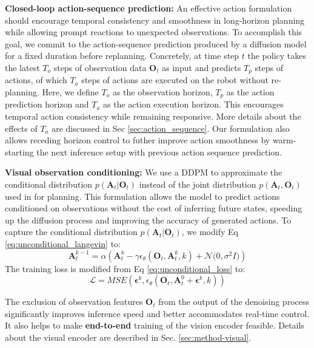 \documentclass[Afour,sageh,times]{sagej}
\begin{document}
\textbf{Closed-loop action-sequence prediction:}
An effective action formulation should encourage temporal consistency and smoothness in long-horizon planning while allowing prompt reactions to unexpected observations.
To accomplish this goal, we commit to the action-sequence prediction produced by a diffusion model for a fixed duration before replanning.
Concretely, at time step $t$ the policy takes the latest $T_o$ steps of observation data $\mathbf{O}_t$ as input and predicts $T_p$ steps of actions, of which $T_a$ steps of actions are executed on the robot without re-planning. Here, we define $T_o$ as the observation horizon, $T_p$ as the action prediction horizon and $T_a$ as the action execution horizon.
This encourages temporal action consistency while remaining responsive. More details about the effects of $T_a$ are discussed in Sec \ref{sec:action_sequence}.
Our formulation also allows receding horizon control \cite{mayne1988receding} to futher improve action smoothness by warm-starting the next inference setup with previous action sequence prediction.




\textbf{Visual observation conditioning:}
We use a DDPM to approximate the conditional distribution $p(\mathbf{A}_t | \mathbf{O}_t)$ instead of the joint distribution $p(\mathbf{A}_t,\mathbf{O}_t)$ used in \citet{janner2022diffuser} for planning. This formulation allows the model to predict actions conditioned on observations without the cost of inferring future states, speeding up the diffusion process and improving the accuracy of generated actions.
To capture the conditional distribution $p(\mathbf{A}_t |\mathbf{O}_t)$, we modify Eq \ref{eq:unconditional_langevin} to:
\begin{equation}
    \label{eq:diffusion_policy_langevin}
    \mathbf{A}^{k-1}_t = \alpha(\mathbf{A}^k_t - \gamma\epsilon_\theta(\mathbf{O}_t,\mathbf{A}^k_t,k) + \mathcal{N} \bigl(0, \sigma^2 I \bigl))
\end{equation}
The training loss is modified from Eq \ref{eq:unconditional_loss} to:
\begin{equation}
    \label{eq:diffusion_policy_loss}
    \mathcal{L}=MSE(\mathbf{\epsilon}^k,\epsilon_\theta(\mathbf{O}_t, \mathbf{A}^0_t + \mathbf{\epsilon}^k, k))
\end{equation}

The exclusion of observation features $\mathbf{O}_t$ from the output of the denoising process significantly improves inference speed and better accommodates real-time control. It also helps to make \textbf{end-to-end} training of the vision encoder feasible.
Details about the visual encoder are described in Sec. \ref{sec:method-visual}.
\end{document}
